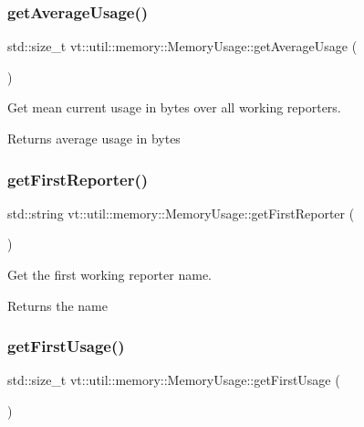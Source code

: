 \subsubsection{\texorpdfstring{get\+Average\+Usage()}{getAverageUsage()}}
{\footnotesize\ttfamily std\+::size\+\_\+t vt\+::util\+::memory\+::\+Memory\+Usage\+::get\+Average\+Usage (\begin{DoxyParamCaption}{ }\end{DoxyParamCaption})}



Get mean current usage in bytes over all working reporters. 

\begin{DoxyReturn}{Returns}
average usage in bytes 
\end{DoxyReturn}
\mbox{\label{structvt_1_1util_1_1memory_1_1_memory_usage_a5baf0fd6bf753755c4602fcb91a7c268}} 
\subsubsection{\texorpdfstring{get\+First\+Reporter()}{getFirstReporter()}}
{\footnotesize\ttfamily std\+::string vt\+::util\+::memory\+::\+Memory\+Usage\+::get\+First\+Reporter (\begin{DoxyParamCaption}{ }\end{DoxyParamCaption})}



Get the first working reporter name. 

\begin{DoxyReturn}{Returns}
the name 
\end{DoxyReturn}
\mbox{\label{structvt_1_1util_1_1memory_1_1_memory_usage_ab02282aab80eb52e5f8f43095af05304}} 
\subsubsection{\texorpdfstring{get\+First\+Usage()}{getFirstUsage()}}
{\footnotesize\ttfamily std\+::size\+\_\+t vt\+::util\+::memory\+::\+Memory\+Usage\+::get\+First\+Usage (\begin{DoxyParamCaption}{ }\end{DoxyParamCaption})}



